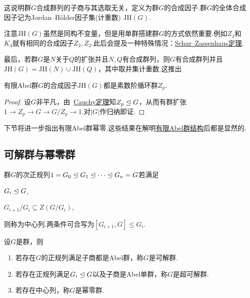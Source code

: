 这说明群$G$合成群列的子商与其选取无关，定义为群$G$的{\heiti 合成因子}.群$G$的全体合成因子记为Jordan--H\"older因子集(计重数) $\mathrm{JH}(G)$.
\begin{remark}
	注意$\mathrm{JH}(G)$虽然是同构不变量，但是用单群搭建群$G$的方式依然重要.例如$Z_4$和$K_4$就有相同的合成因子$Z_2,Z_2$.此后会提及一种特殊情况：\hyperlink{thm:SchurZassenhaus}{Schur--Zassenhaus定理}.
\end{remark}

最后，若群$G$是$N$关于$Q$的扩张并且$N,Q$有合成群列，则$G$有合成群列并且$\mathrm{JH}(G)=\mathrm{JH}(N)\cup\mathrm{JH}(Q)$，其中取并集计重数.这推出
\begin{prop}
	有限Abel群$G$的合成因子$\mathrm{JH}(G)$都是素数阶循环群$Z_p$.
\end{prop}
\begin{proof}
	设$G$非平凡，由~\hyperlink{thm:Cauchy}{Cauchy定理}知$Z_p\trianglelefteq G$，从而有群扩张$1\to Z_p\to G\to G/Z_p\to 1$.对$|G|$作归纳即证.
\end{proof}
\begin{remark}
	下节将进一步指出有限Abel群幂零.这些结果在解明\hyperlink{thm:FiniteAbelStruc}{有限Abel群结构}后都是显然的.
\end{remark}
\subsection{可解群与幂零群}
\begin{definition}
	群$G$的次正规列$1=G_0\trianglelefteq G_1\trianglelefteq\cdots\trianglelefteq G_n=G$若满足
	
	\begin{enumerate*}
		\item $G_i\trianglelefteq G$,\phantom{\qquad}
		\item $G_{i+1}/G_i\subseteq Z(G/G_i)$,
	\end{enumerate*}
	
	则称为{\heiti 中心列}.两条件可合写为$[G_{i+1},G]\le G_i$.
\end{definition}
\begin{definition}
	设$G$是群，则
	\begin{enumerate}
		\item 若存在$G$的正规列满足子商都是Abel群，称$G$是{\heiti 可解群}.
		\item 若存在正规列满足$G_i\trianglelefteq G$以及子商是Abel单群，称$G$是{\heiti 超可解群}.
		\item 若存在中心列，称$G$是{\heiti 幂零群}.
	\end{enumerate}
\end{definition}

